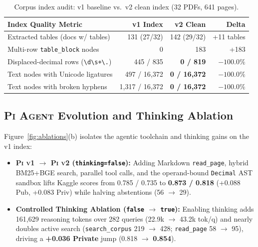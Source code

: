 \documentclass[sigconf,nonacm]{acmart}
\newcommand{\code}[1]{\texttt{\small #1}}
\begin{document}
\begin{table}[t]
  \centering
  \caption{Corpus index audit: v1 baseline vs.\ v2 clean index (32 PDFs, 641 pages).}
  \label{tab:index}
  \footnotesize
  \setlength{\tabcolsep}{4.5pt}
  \begin{tabular}{@{}lrrr@{}}
    \toprule
    \textbf{Index Quality Metric} & \textbf{v1 Index} & \textbf{v2 Clean} & \textbf{Delta} \\
    \midrule
    Extracted tables (docs w/ tables) & 131 (27/32) & 142 (29/32) & +11 tables \\
    Multi-row \code{table\_block} nodes & 0 & 183 & +183 \\
    Displaced-decimal rows (\code{\textbackslash d\textbackslash s+\textbackslash .}) & 445 / 835 & \textbf{0 / 819} & $-100.0\%$ \\
    Text nodes with Unicode ligatures & 497 / 16,372 & \textbf{0 / 16,372} & $-100.0\%$ \\
    Text nodes with broken hyphens & 1,317 / 16,372 & \textbf{0 / 16,372} & $-100.0\%$ \\
    \bottomrule
  \end{tabular}
  \vspace{-0.8em}
\end{table}

\subsection{\textsc{Pi Agent} Evolution and Thinking Ablation}
Figure~\ref{fig:ablations}(b) isolates the agentic toolchain and thinking gains on the v1 index:
\begin{itemize}
  \item \textbf{\textsc{Pi v1} $\to$ \textsc{Pi v2} (\code{thinking=false}):} Adding Markdown \code{read\_page}, hybrid BM25+BGE search, parallel tool calls, and the operand-bound \code{Decimal} AST sandbox lifts Kaggle scores from 0.785 / 0.735 to \textbf{0.873 / 0.818} (+0.088 Pub, +0.083 Priv) while halving abstentions (56 $\to$ 29).
  \item \textbf{Controlled Thinking Ablation (\code{false} $\to$ \code{true}):} Enabling thinking adds 161,629 reasoning tokens over 282 queries (22.9k $\to$ 43.2k tok/q) and nearly doubles active search (\code{search\_corpus} 219 $\to$ 428; \code{read\_page} 58 $\to$ 95), driving a \textbf{+0.036 Private} jump (0.818 $\to$ \textbf{0.854}).
\end{itemize}
\end{document}

